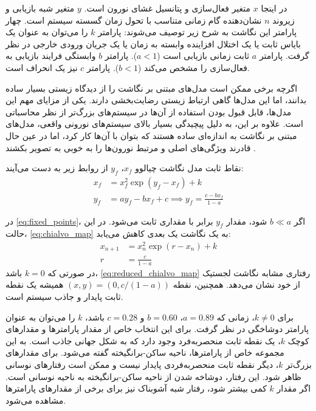 در اینجا
\( x \)
متغیر فعال‌سازی
و پتانسیل غشای نورون است.
\( y \)
متغیر شبه بازیابی
و زیروند
\( n \)
نشان‌دهنده گام زمانی متناسب با تحول زمان گسسته سیستم است.
چهار پارامتر این نگاشت به شرح زیر توصیف می‌شوند:
پارامتر
\( k \)
را می‌توان به عنوان یک بایاس ثابت یا یک اختلال افزاینده وابسته به زمان یا یک جریان ورودی خارجی در نظر گرفت.
پارامتر
\( a \)
ثابت زمانی بازیابی است
(\( a < 1 \)).
پارامتر
\( b \)
وابستگی فرایند بازیابی به فعال‌سازی را مشخص می‌کند
(\( b < 1 \)).
پارامتر
\( c \)
نیز یک انحراف است.

اگرچه برخی ممکن است مدل‌های مبتنی بر نگاشت را از دیدگاه زیستی بسیار ساده بدانند، اما این مدل‌ها گاهی ارتباط زیستی رضایت‌بخشی دارند.
یکی از مزایای مهم این مدل‌ها، قابل قبول بودن استفاده از آن‌ها در سیستم‌های بزرگ‌تر از نظر محاسباتی است.
علاوه بر این، به دلیل پیچیدگی بسیار بالای سیستم‌های نورونی واقعی، مدل‌های مبتنی بر نگاشت به اندازه‌ای ساده هستند که بتوان با آن‌ها کار کرد، اما در عین حال قادرند ویژگی‌های اصلی و مرتبط نورون‌ها را به خوبی به تصویر بکشند
\cite{pilarczyk2023}.

نقاط ثابت مدل نگاشت چیالوو
\( x_{f} \)، \( y_{f} \)
از روابط زیر به دست می‌آیند:
\begin{subequations} \label{eq:fixed_points}
    \begin{align}
        x_{f} & = x_{f}^{2} \exp(y_{f} - x_{f}) + k                                \\
        y_{f} & = a y_{f} - b x_{f} + c \implies y_{f} = \frac{c - b x_{f}}{1 - a}
    \end{align}
\end{subequations}

در
\autoref{eq:fixed_points}،
اگر
\( b \ll a \)
شود، مقدار
\( y_{f} \)
برابر با مقداری ثابت می‌شود.
در این حالت،
\autoref{eq:chialvo_map}
به یک نگاشت یک بعدی کاهش می‌یابد:
\begin{subequations} \label{eq:reduced_chialvo_map}
    \begin{align}
        x_{n+1} & = x_{n}^{2} \exp(r - x_{n}) + k \\
        r       & = \frac{c}{1 - a}
    \end{align}
\end{subequations}
در صورتی که
\( k = 0 \)
باشد،
\autoref{eq:reduced_chialvo_map}
رفتاری مشابه نگاشت لجستیک از خود نشان می‌دهد.
همچنین، نقطه
\( (x, y) = (0, c / (1 - a)) \)
همیشه یک نقطه ثابت پایدار و جاذب سیستم است.

برای
\( k \ne 0 \)،
زمانی که
\( a = 0.89 \)، \( b = 0.60 \) و \( c = 0.28 \)
باشد،
\( k \)
را می‌توان به عنوان پارامتر دوشاخگی در نظر گرفت.
برای این انتخاب خاص از مقدار پارامترها و مقدارهای کوچک
\( k \)،
یک نقطه ثابت منحصربه‌فرد وجود دارد که به شکل جهانی جاذب است.
به این مجموعه خاص از پارامترها، ناحیه ساکن-برانگیخته گفته می‌شود.
برای مقدارهای بزرگ‌تر
\( k \)،
دیگر نقطه ثابت منحصربه‌فردی پایدار نیست و ممکن است رفتارهای نوسانی ظاهر شود.
این رفتار، دوشاخه شدن از ناحیه ساکن-برانگیخته به ناحیه نوسانی است.
اگر مقدار
\( k \)
کمی بیشتر شود، رفتار شبه آشوبناک نیز برای برخی از مقدارهای پارامترها مشاهده می‌شود.

